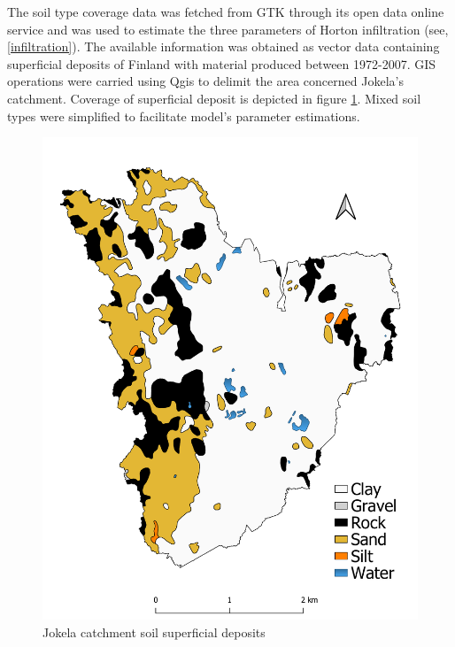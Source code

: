     The soil type coverage data was fetched from \acf{GTK} \cite{gtkdata} through its open data online service and was used to estimate the three parameters of Horton infiltration (see, \ref{infiltration}). The available information was obtained as vector data containing superficial deposits of Finland with material produced between 1972-2007. GIS operations were carried using Qgis to delimit the area concerned Jokela's catchment. Coverage of superficial deposit is depicted in figure \ref{fig:supdeposits}. Mixed soil types were simplified to facilitate model's parameter estimations.\\
    
\begin{figure}[h]
    \centering
	\includegraphics[scale=0.4]{figures/Jokela_Superficial_Deposits.pdf}
	\caption{Jokela catchment soil superficial deposits}
	\label{fig:supdeposits}
\end{figure}

